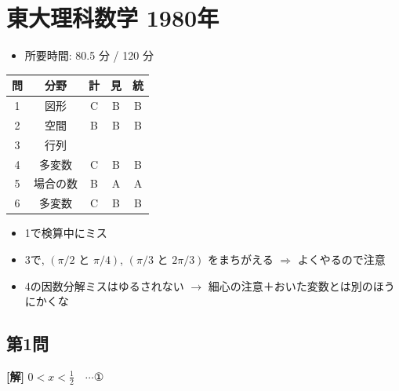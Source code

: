 \documentclass[../main.tex]{subfiles}
\begin{document}
\section*{東大理科数学 1980年}

\begin{itemize}
  \item 所要時間: 80.5 分 / 120 分
\end{itemize}

\begin{center}
  \begin{tabular}{|c|c|c|c|c|}
    \hline
    問 & 分野 & 計 & 見 & 統 \\ \hline
    1 & 図形 & C & B & B \\ \hline
    2 & 空間 & B & B & B \\ \hline
    3 & 行列 & & & \\ \hline
    4 & 多変数 & C & B & B \\ \hline
    5 & 場合の数 & B & A & A \\ \hline
    6 & 多変数 & C & B & B \\ \hline
  \end{tabular}
\end{center}

\begin{itemize}
  \item 1で検算中にミス
  \item 3で, $(\pi/2 \text{ と } \pi/4)$, $(\pi/3 \text{ と } 2\pi/3)$ をまちがえる $\Rightarrow$ よくやるので注意
  \item 4の因数分解ミスはゆるされない $\rightarrow$ 細心の注意＋おいた変数とは別のほうにかくな
\end{itemize}

\newpage

\subsection*{第1問}

\noindent
\textbf{[解]} $0 < x < \frac{1}{2} \quad \cdots \text{①}$
\end{document}
